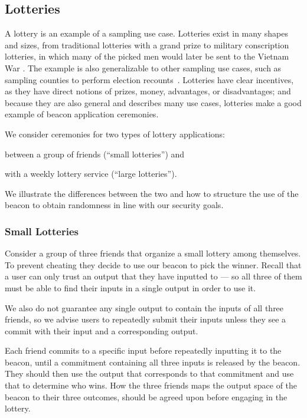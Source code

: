 \subsection{Lotteries}
A lottery is an example of a sampling use case.
Lotteries exist in many shapes and sizes, from traditional lotteries with a grand prize to military conscription lotteries, in which many of the picked men would later be sent to the Vietnam War \cite{starr1997nonrandom}.
The example is also generalizable to other sampling use cases, such as sampling counties to perform election recounts~\cite{bushgore}.
Lotteries have clear incentives, as they have direct notions of prizes, money, advantages, or disadvantages; and because they are also general and describes many use cases, lotteries make a good example of beacon application ceremonies.

We consider ceremonies for two types of lottery applications:
\begin{eletterate*}
\item between a group of friends (\enquote{small lotteries}) and
\item with a weekly lottery service (\enquote{large lotteries}).
\end{eletterate*}
We illustrate the differences between the two and how to structure the use of the beacon to obtain randomness in line with our security goals.

\subsubsection{Small Lotteries}
Consider a group of three friends that organize a small lottery among themselves.
To prevent cheating they decide to use our beacon to pick the winner.
Recall that a user can only trust an output that they have inputted to --- so all three of them must be able to find their inputs in a single output in order to use it.

We also do not guarantee any single output to contain the inputs of all three friends, so we advise users to repeatedly submit their inputs unless they see a commit with their input and a corresponding output.

Each friend commits to a specific input before repeatedly inputting it to the beacon, until a commitment containing all three inputs is released by the beacon.
They should then use the output that corresponds to that commitment and use that to determine who wins.
How the three friends maps the output space of the beacon to their three outcomes, should be agreed upon before engaging in the lottery.

